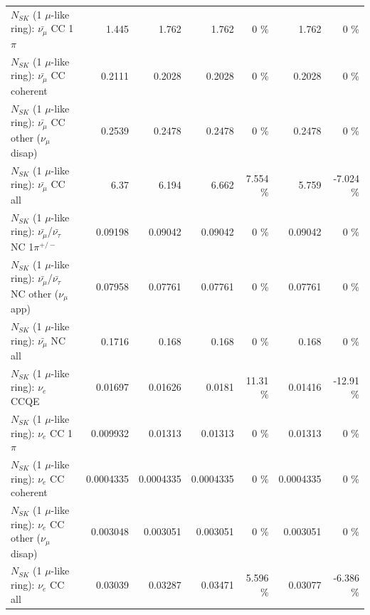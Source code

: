 \begin{table}
\begin{tabular}{| l | r | r | r  r | r  r |}
                         $N_{SK}$ (1 $\mu$-like ring): $\bar{\nu_\mu}$ CC 1$\pi$ &           1.445 &           1.762 &           1.762 &        0 \%  &           1.762 &        0 \%  \\ 
                       $N_{SK}$ (1 $\mu$-like ring): $\bar{\nu_\mu}$ CC coherent &          0.2111 &          0.2028 &          0.2028 &        0 \%  &          0.2028 &        0 \%  \\ 
        $N_{SK}$ (1 $\mu$-like ring): $\bar{\nu_\mu}$ CC other ($\nu_\mu$ disap) &          0.2539 &          0.2478 &          0.2478 &        0 \%  &          0.2478 &        0 \%  \\ 
                          $N_{SK}$ (1 $\mu$-like ring): $\bar{\nu_{\mu}}$ CC all &            6.37 &           6.194 &           6.662 &    7.554 \%  &           5.759 &   -7.024 \%  \\ 
\hline
  $N_{SK}$ (1 $\mu$-like ring): $\bar{\nu_\mu}$/$\bar{\nu_\tau}$ NC 1$\pi^{+/-}$ &         0.09198 &         0.09042 &         0.09042 &        0 \%  &         0.09042 &        0 \%  \\ 
$N_{SK}$ (1 $\mu$-like ring): $\bar{\nu_\mu}$/$\bar{\nu_\tau}$ NC other ($\nu_\mu$ app) &         0.07958 &         0.07761 &         0.07761 &        0 \%  &         0.07761 &        0 \%  \\ 
                          $N_{SK}$ (1 $\mu$-like ring): $\bar{\nu_{\mu}}$ NC all &          0.1716 &           0.168 &           0.168 &        0 \%  &           0.168 &        0 \%  \\ 
\hline
\hline
\hline
                                      $N_{SK}$ (1 $\mu$-like ring): $\nu_e$ CCQE &         0.01697 &         0.01626 &          0.0181 &    11.31 \%  &         0.01416 &   -12.91 \%  \\ 
                                 $N_{SK}$ (1 $\mu$-like ring): $\nu_e$ CC 1$\pi$ &        0.009932 &         0.01313 &         0.01313 &        0 \%  &         0.01313 &        0 \%  \\ 
                               $N_{SK}$ (1 $\mu$-like ring): $\nu_e$ CC coherent &       0.0004335 &       0.0004335 &       0.0004335 &        0 \%  &       0.0004335 &        0 \%  \\ 
                $N_{SK}$ (1 $\mu$-like ring): $\nu_e$ CC other ($\nu_\mu$ disap) &        0.003048 &        0.003051 &        0.003051 &        0 \%  &        0.003051 &        0 \%  \\ 
                                  $N_{SK}$ (1 $\mu$-like ring): $\nu_{e}$ CC all &         0.03039 &         0.03287 &         0.03471 &    5.596 \%  &         0.03077 &   -6.386 \%  \\ 

\end{tabular}
\end{table}
